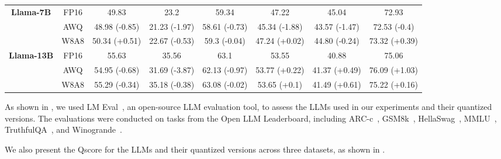 \begin{table*}[!t]
\begin{adjustbox}{width=\textwidth}
\begin{tabular}{c|c|c|c|c|c|c|c}
 \hline
 \multirow{3}{*}{\textbf{Llama-7B}} & FP16  & 49.83  & 23.2 & 59.34 & 47.22 & 45.04 & 72.93 \\
 & AWQ   & 48.98 {\color{red} (-0.85)}& 21.23{\color{red} (-1.97)} & 58.61 {\color{red} (-0.73)} & 45.34 {\color{red} (-1.88)} & 43.57 {\color{red} (-1.47)} & 72.53 {\color{red} (-0.4)} \\
 & W8A8  & 50.34 {\color{green} (+0.51)} & 22.67 {\color{red} (-0.53)} & 59.3 {\color{red} (-0.04)} & 47.24 {\color{green} (+0.02)} & 44.80 {\color{red} (-0.24)} & 73.32 {\color{green} (+0.39)} \\
\hline
 \multirow{3}{*}{\textbf{Llama-13B}} & FP16  & 55.63  & 35.56 & 63.1 & 53.55 & 40.88 & 75.06 \\
 & AWQ   & 54.95 {\color{red} (-0.68)}& 31.69{\color{red} (-3.87)} & 62.13 {\color{red} (-0.97)} & 53.77 {\color{green} (+0.22)} & 41.37 {\color{green} (+0.49)} & 76.09 {\color{green} (+1.03)} \\
 & W8A8  & 55.29 {\color{red} (-0.34)} & 35.18 {\color{red} (-0.38)} & 63.08 {\color{red} (-0.02)} & 53.65 {\color{green} (+0.1)} & 41.49 {\color{green} (+0.61)} & 75.22 {\color{green} (+0.16)} \\
 \bottomrule
\end{tabular}
\end{adjustbox}
\end{table*}

As shown in , we used LM Eval~\cite{eval-harness}, an open-source LLM evaluation tool, to assess the LLMs used in our experiments and their quantized versions. The evaluations were conducted on tasks from the Open LLM Leaderboard, including ARC-c~\cite{clark2018arc}, GSM8k~\cite{cobbe2021gsm8k}, HellaSwag~\cite{zellers2019hellaswag}, MMLU~\cite{hendrycks2020mmlu}, TruthfulQA~\cite{lin2021truthfulqa}, and Winogrande~\cite{sakaguchi2021winogrande}.

We also present the Qscore for the LLMs and their quantized versions across three datasets, as shown in .


